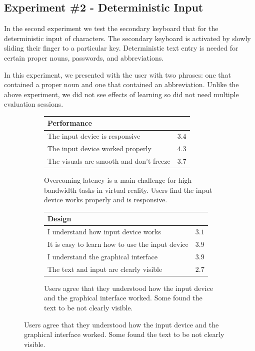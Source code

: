 \subsection{Experiment \#2 - Deterministic Input}
In the second experiment we test the secondary keyboard that for the deterministic input of characters.
The secondary keyboard is activated by slowly sliding their finger to a particular key.
Deterministic text entry is needed  for certain proper nouns, passwords, and abbreviations.

In this experiment, we presented with the user with two phrases: one that contained a proper noun and one that contained an abbreviation.
Unlike the above experiment, we did not see effects of learning so did not need multiple evaluation sessions.


\begin{figure}
\centering

\begin{subfigure}{1\columnwidth}
  \begin{tabular}{@{}p{7cm}p{1cm}@{}}\toprule
  \textbf{Performance}                      &         \\
  \midrule
   The input device is responsive           &     $3.4$   \\
   The input device worked properly           &     $4.3$   \\
   The visuals are  smooth and don't freeze       &     $3.7$   \\
  \bottomrule
  \end{tabular}
  \caption{Overcoming latency is a main challenge for high bandwidth tasks in virtual reality. 
  Users find the input device works properly and is responsive.}
  \label{fig:performance}
\end{subfigure}


\vspace{4mm} 

\begin{subfigure}{1\columnwidth}
  \begin{tabular}{@{}p{7cm}p{1cm}@{}}\toprule
  \textbf{Design}                                 &     \\
  \midrule
  I understand how input device works                   &   $3.1$ \\
  It is easy to learn how to use the input device             &   $3.9$ \\
  I understand the graphical interface                    &   $3.9$ \\
  The text and input are clearly visible                  &   $2.7$ \\
  \bottomrule
  \end{tabular}
  \caption{Users agree that they understood how the input device and the graphical interface worked.
  Some found the text to be not clearly visible.}
  \label{fig:design}
\end{subfigure}



\end{figure}
